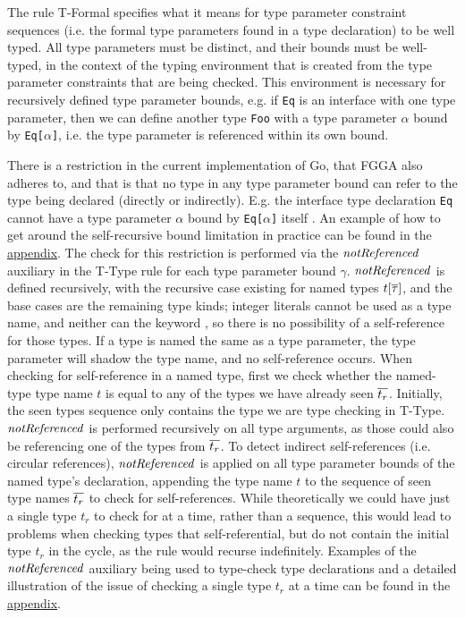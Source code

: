 The rule T-Formal specifies what it means for type parameter constraint
sequences (i.e. the formal type parameters found in a type declaration) to be
well typed. All type parameters must be distinct, and their bounds must be
well-typed, in the context of the typing environment that is created from the
type parameter constraints that are being checked. This environment is necessary
for recursively defined type parameter bounds, e.g. if \texttt{Eq} is an
interface with one type parameter, then we can define another type \texttt{Foo}
with a type parameter $\alpha$ bound by \texttt{Eq[$\alpha$]}, i.e. the type
parameter is referenced within its own bound.

There is a restriction in the current implementation of Go, that FGGA also
adheres to, and that is that no type in any type parameter bound can refer to
the type being declared (directly or indirectly). E.g. the interface type
declaration \texttt{Eq} cannot have a type parameter $\alpha$ bound by
\texttt{Eq[$\alpha$]} itself \autocite{spec}. An example of how to get around
the self-recursive bound limitation in practice can be found in the
\hyperref[sec:self-ref-type-in-bound]{appendix}.
The check for this restriction is performed via the $\mathit{notReferenced}$ auxiliary in the
T-Type rule for each type parameter bound $\gamma$. $\mathit{notReferenced}$ is defined
recursively, with the recursive case existing for named types $t[\overline{\tau}]$,
and the base cases are the remaining type kinds; integer literals cannot be used
as a type name, and neither can the keyword , so there is no
possibility of a self-reference for those types. If a type is named the same as
a type parameter, the type parameter will shadow the type name, and no
self-reference occurs.
When checking for self-reference in a named type, first we check whether the
named-type type name $t$ is equal to any of the types we have already seen
$\overline{t_r}$. Initially, the seen types sequence only contains the type we are
type checking in T-Type. $\mathit{notReferenced}$ is performed recursively on all type
arguments, as those could also be referencing one of the types from $\overline{t_r}$.
To detect indirect self-references (i.e. circular references), $\mathit{notReferenced}$ is
applied on all type parameter bounds of the named type's declaration, appending
the type name $t$ to the sequence of seen type names $\overline{t_r}$ to check for
self-references. While theoretically we could have just a single type $t_r$ to
check for at a time, rather than a sequence, this would lead to problems when
checking types that self-referential, but do not contain the initial type $t_r$
in the cycle, as the rule would recurse indefinitely. Examples of the $\mathit{notReferenced}$
auxiliary being used to type-check type declarations and a detailed illustration
of the issue of checking a single type $t_r$ at a time can be found in the
\hyperref[sec:fgg-self-ref-derivation-examples]{appendix}.

